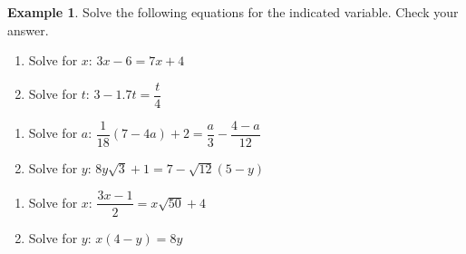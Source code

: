 \documentclass[11pt]{article}
\theoremstyle{definition}  %
\newtheorem{ex}{\bf Example}[section]
\newcounter{HW}
\begin{document}
\begin{ex}\label{lineareqnreview}  Solve the following equations for the indicated variable.  Check your answer.

\begin{multicols}{2}

\begin{enumerate}

\item  Solve for $x$: $3x - 6 = 7x + 4$

\item  Solve for $t$: $3 - 1.7t = \dfrac{t}{4}$

\setcounter{HW}{\value{enumi}}

\end{enumerate}

\end{multicols}

\begin{multicols}{2}

\begin{enumerate}

\setcounter{enumi}{\value{HW}}

\item  Solve for $a$: $\dfrac{1}{18}(7 - 4a) + 2 = \dfrac{a}{3} - \dfrac{4-a}{12}$

\item  Solve for $y$:  $8 y \sqrt{3} + 1 = 7 - \sqrt{12}(5 - y)$

\setcounter{HW}{\value{enumi}}

\end{enumerate}

\end{multicols}

\begin{multicols}{2}

\begin{enumerate}

\setcounter{enumi}{\value{HW}}

\item  Solve for $x$: $\dfrac{3x-1}{2} = x\sqrt{50} + 4$

\item  Solve for $y$:  $x(4-y) = 8y$

\setcounter{HW}{\value{enumi}}

\end{enumerate}


\end{multicols}
\end{ex}
\end{document}
